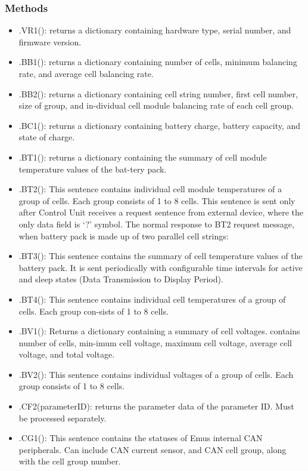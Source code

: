 \subsubsection{Methods}
\begin{itemize}
	\item .VR1(): returns a dictionary containing hardware type, serial number, and firmware version.
	\item .BB1(): returns a dictionary containing number of cells, minimum balancing rate, and average cell balancing rate.
	\item .BB2(): returns a dictionary containing cell string number, first cell number, size of group, and in-dividual cell module balancing rate of each cell group. 
	\item .BC1(): returns a dictionary containing battery charge, battery capacity, and state of charge.
	\item .BT1(): returns a dictionary containing the summary of cell module temperature values of the bat-tery pack.
	\item .BT2(): This sentence contains individual cell module temperatures of a group of cells. Each group consists of 1 to 8 cells. This sentence is sent only after Control Unit receives a request sentence from external device, where the only data field is ‘?’ symbol. The normal response to BT2 request message, when battery pack is made up of two parallel cell strings:
	\item .BT3(): This sentence contains the summary of cell temperature values of the battery pack. It is sent periodically with configurable time intervals for active and sleep states (Data Transmission to Display Period).	
	\item .BT4(): This sentence contains individual cell temperatures of a group of cells. Each group con-sists of 1 to 8 cells.
	\item .BV1(): Returns a dictionary containing a summary of cell voltages. contains number of cells, min-imum cell voltage, maximum cell voltage, average cell voltage, and total voltage.
	\item .BV2(): This sentence contains individual voltages of a group of cells. Each group consists of 1 to 8 cells.
	\item .CF2(parameterID): returns the parameter data of the parameter ID. Must be processed separately.
	\item .CG1(): This sentence contains the statuses of Emus internal CAN peripherals. Can include CAN current sensor, and CAN cell group, along with the cell group number.

\end{itemize}
